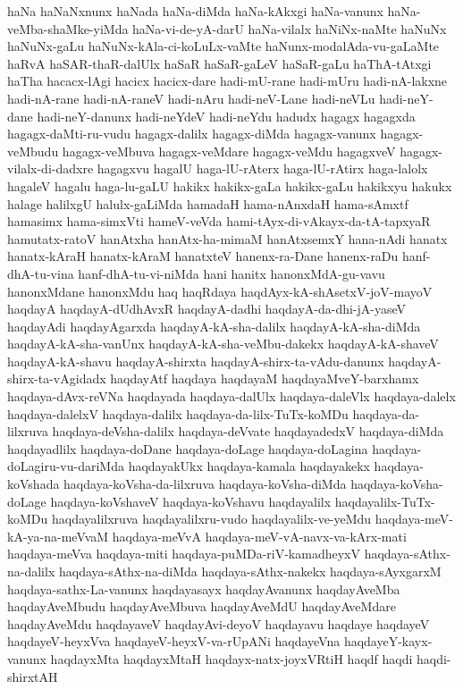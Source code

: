 {haNa
haNaNxnunx
haNada
haNa-diMda
haNa-kAkxgi
haNa-vanunx
haNa-veMba-shaMke-yiMda
haNa-vi-de-yA-darU
haNa-vilalx
haNiNx-naMte
haNuNx
haNuNx-gaLu
haNuNx-kAla-ci-koLuLx-vaMte
haNunx-modalAda-vu-gaLaMte
haRvA
haSAR-thaR-dalUlx
haSaR
haSaR-gaLeV
haSaR-gaLu
haThA-tAtxgi
haTha
hacacx-lAgi
hacicx
hacicx-dare
hadi-mU-rane
hadi-mUru
hadi-nA-lakxne
hadi-nA-rane
hadi-nA-raneV
hadi-nAru
hadi-neV-Lane
hadi-neVLu
hadi-neY-dane
hadi-neY-danunx
hadi-neYdeV
hadi-neYdu
hadudx
hagagx
hagagxda
hagagx-daMti-ru-vudu
hagagx-dalilx
hagagx-diMda
hagagx-vanunx
hagagx-veMbudu
hagagx-veMbuva
hagagx-veMdare
hagagx-veMdu
hagagxveV
hagagx-vilalx-di-dadxre
hagagxvu
hagalU
haga-lU-rAterx
haga-lU-rAtirx
haga-lalolx
hagaleV
hagalu
haga-lu-gaLU
hakikx
hakikx-gaLa
hakikx-gaLu
hakikxyu
hakukx
halage
halilxgU
halulx-gaLiMda
hamadaH
hama-nAnxdaH
hama-sAmxtf
hamasimx
hama-simxVti
hameV-veVda
hami-tAyx-di-vAkayx-da-tA-tapxyaR
hamutatx-ratoV
hanAtxha
hanAtx-ha-mimaM
hanAtxsemxY
hana-nAdi
hanatx
hanatx-kAraH
hanatx-kAraM
hanatxteV
hanenx-ra-Dane
hanenx-raDu
hanf-dhA-tu-vina
hanf-dhA-tu-vi-niMda
hani
hanitx
hanonxMdA-gu-vavu
hanonxMdane
hanonxMdu
haq
haqRdaya
haqdAyx-kA-shAsetxV-joV-mayoV
haqdayA
haqdayA-dUdhAvxR
haqdayA-dadhi
haqdayA-da-dhi-jA-yaseV
haqdayAdi
haqdayAgarxda
haqdayA-kA-sha-dalilx
haqdayA-kA-sha-diMda
haqdayA-kA-sha-vanUnx
haqdayA-kA-sha-veMbu-dakekx
haqdayA-kA-shaveV
haqdayA-kA-shavu
haqdayA-shirxta
haqdayA-shirx-ta-vAdu-danunx
haqdayA-shirx-ta-vAgidadx
haqdayAtf
haqdaya
haqdayaM
haqdayaMveY-barxhamx
haqdaya-dAvx-reVNa
haqdayada
haqdaya-dalUlx
haqdaya-daleVlx
haqdaya-dalelx
haqdaya-dalelxV
haqdaya-dalilx
haqdaya-da-lilx-TuTx-koMDu
haqdaya-da-lilxruva
haqdaya-deVsha-dalilx
haqdaya-deVvate
haqdayadedxV
haqdaya-diMda
haqdayadlilx
haqdaya-doDane
haqdaya-doLage
haqdaya-doLagina
haqdaya-doLagiru-vu-dariMda
haqdayakUkx
haqdaya-kamala
haqdayakekx
haqdaya-koVshada
haqdaya-koVsha-da-lilxruva
haqdaya-koVsha-diMda
haqdaya-koVsha-doLage
haqdaya-koVshaveV
haqdaya-koVshavu
haqdayalilx
haqdayalilx-TuTx-koMDu
haqdayalilxruva
haqdayalilxru-vudo
haqdayalilx-ve-yeMdu
haqdaya-meV-kA-ya-na-meVvaM
haqdaya-meVvA
haqdaya-meV-vA-navx-va-kArx-mati
haqdaya-meVva
haqdaya-miti
haqdaya-puMDa-riV-kamadheyxV
haqdaya-sAthx-na-dalilx
haqdaya-sAthx-na-diMda
haqdaya-sAthx-nakekx
haqdaya-sAyxgarxM
haqdaya-sathx-La-vanunx
haqdayasayx
haqdayAvanunx
haqdayAveMba
haqdayAveMbudu
haqdayAveMbuva
haqdayAveMdU
haqdayAveMdare
haqdayAveMdu
haqdayaveV
haqdayAvi-deyoV
haqdayavu
haqdaye
haqdayeV
haqdayeV-heyxVva
haqdayeV-heyxV-va-rUpANi
haqdayeVna
haqdayeY-kayx-vanunx
haqdayxMta
haqdayxMtaH
haqdayx-natx-joyxVRtiH
haqdf
haqdi
haqdi-shirxtAH
}

